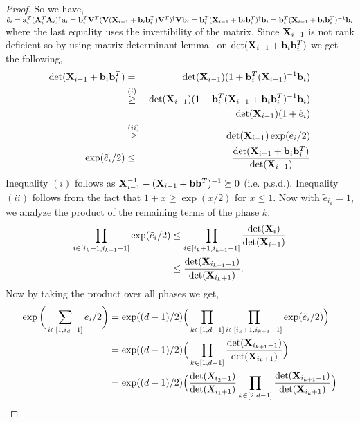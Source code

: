 \begin{proof}{\label{proof:onlineSummationBound}}
So we have, $\tilde{e}_{i} = \mathbf{a}_{i}^T(\mathbf{A}_{i}^T \mathbf{A}_{i} )^{\dagger}\mathbf{a}_{i} = \mathbf{b}_{i}^T\mathbf{V}^T(\mathbf{V}(\mathbf{X}_{i-1}+\mathbf{b}_{i} \mathbf{b}_{i}^T)\mathbf{V}^T)^{\dagger}\mathbf{V} \mathbf{b}_{i}=  \mathbf{b}_{i}^T(\mathbf{X}_{i-1}+\mathbf{b}_{i}\mathbf{b}_{i}^T)^{\dagger}\mathbf{b}_{i} = \mathbf{b}_{i}^T(\mathbf{X}_{i-1}+\mathbf{b}_{i}\mathbf{b}_{i}^T)^{-1}\mathbf{b}_{i}$
where the last equality uses the invertibility of the matrix. 
%  
 Since $\mathbf{X}_{i-1}$ is not rank deficient so by using matrix determinant lemma~\cite{harville1998matrix} on
 $\mbox{det}(\mathbf{X}_{i-1}+\mathbf{b}_{i}\mathbf{b}_{i}^T)$ we get the following,
 \begin{eqnarray*}
  \mbox{det}(\mathbf{X}_{i-1}+\mathbf{b}_{i}\mathbf{b}_{i}^T) &=& \mbox{det}(\mathbf{X}_{i-1})(1+\mathbf{b}_{i}^T(\mathbf{X}_{i-1})^{-1}\mathbf{b}_{i}) \\
  &\stackrel{(i)}{\geq}& \mbox{det}(\mathbf{X}_{i-1})(1+\mathbf{b}_{i}^T(\mathbf{X}_{i-1}+\mathbf{b}_{i} \mathbf{b}_{i}^T)^{-1}\mathbf{b}_{i}) \\
  &=& \mbox{det}(\mathbf{X}_{i-1})(1+\tilde{e}_{i}) \\
  &\stackrel{(ii)}{\geq}& \mbox{det}(\mathbf{X}_{i-1})\exp(\tilde{e}_{i}/2) \\
  \exp(\tilde{e}_{i}/2) &\leq& \frac{\mbox{det}(\mathbf{X}_{i-1}+\mathbf{b}_{i}\mathbf{b}_{i}^T)}{\mbox{det}(\mathbf{X}_{i-1})}
 \end{eqnarray*}
 Inequality $(i)$ follows as $\mathbf{X}_{i-1}^{-1} - (\mathbf{X}_{i-1} + \mathbf{b}\mathbf{b}^T)^{-1}\succeq 0$ (i.e. p.s.d.). Inequality $(ii)$ follows from
 the fact that $1+x \ge \exp(x/2)$ for $x \leq 1$. Now with $\tilde{e}_{i_k} =1$, we analyze the product of the remaining terms of the phase $k$,
 \begin{align*}
  \prod_{i\in[i_k+1, i_{k+1}-1]} \exp(\tilde{e}_{i}/2) &\le \prod_{i\in[i_k+1, i_{k+1}-1]}  \frac{\mbox{det}(\mathbf{X}_{i})}{\mbox{det}(\mathbf{X}_{i-1})} \\
  &\le \frac{\mbox{det}(\mathbf{X}_{i_{k+1}-1})}{\mbox{det}(\mathbf{X}_{i_k+1})}.
 \end{align*}
 Now by taking the product over all phases we get,
\begin{align*}
 \exp\bigg(\sum_{i\in [1, i_{d}-1]} \tilde{e}_{i}/2\bigg) 
 & = \exp((d-1)/2)\Big(\prod_{k\in [1,d-1]} \prod_{i\in[i_k+1, i_{k+1}-1]} \exp(\tilde{e}_{i}/2)\Big) \\
 & = \exp((d-1)/2)\Big(\prod_{k\in [1,d-1]}\frac{\mbox{det}(\*X_{i_{k+1}-1})}{\mbox{det}(\*X_{i_k+1})}\Big) \\ 
 & = \exp((d-1)/2)\Big(\frac{\mbox{det}(X_{i_{2}-1})}{\mbox{det}(X_{i_1+1})}\prod_{k\in [2,d-1]} \frac{\mbox{det}(\*X_{i_{k+1}-1})}{\mbox{det}(\*X_{i_k+1})}\Big)

\end{align*}
\end{proof}
